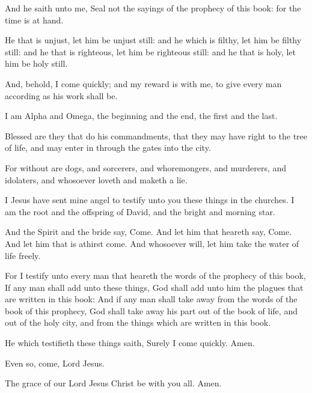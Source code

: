 \Verse And he saith unto me, Seal not the sayings of the prophecy of this book: for the time is at hand.

\Verse He that is unjust, let him be unjust still: and he which is filthy, let him be filthy still: and he that is righteous, let him be righteous still: and he that is holy, let him be holy still.

\Verse And, behold, I come quickly; and my reward is with me, to give every man according as his work shall be.

\Verse I am Alpha and Omega, the beginning and the end, the first and the last.

\Verse Blessed are they that do his commandments, that they may have right to the tree of life, and may enter in through the gates into the city.

\Verse For without are dogs, and sorcerers, and whoremongers, and murderers, and idolaters, and whosoever loveth and maketh a lie.

\Verse I Jesus have sent mine angel to testify unto you these things in the churches. I am the root and the offspring of David, and the bright and morning star.

\Verse And the Spirit and the bride say, Come. And let him that heareth say, Come. And let him that is athirst come. And whosoever will, let him take the water of life freely.

\Verse For I testify unto every man that heareth the words of the prophecy of this book, If any man shall add unto these things, God shall add unto him the plagues that are written in this book: \Verse And if any man shall take away from the words of the book of this prophecy, God shall take away his part out of the book of life, and out of the holy city, and from the things which are written in this book.

\Verse He which testifieth these things saith, Surely I come quickly.  Amen.

Even so, come, Lord Jesus.

\Verse The grace of our Lord Jesus Christ be with you all. Amen.

